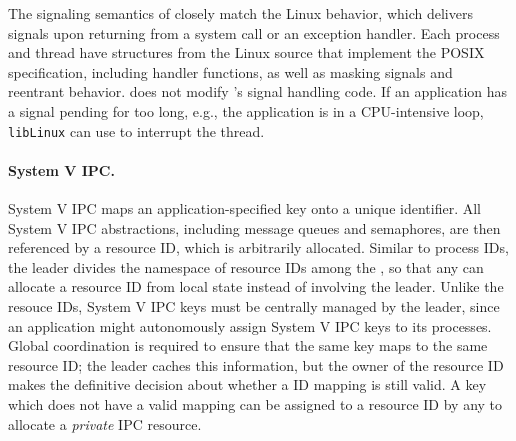 The signaling semantics of \thelibos{} closely match the Linux behavior, which
delivers signals upon returning from a system call
or an exception handler.
Each process and thread have  structures from the Linux source 
that implement the
POSIX specification, including handler functions, as well as masking signals and
reentrant behavior.
\thelibos{} does not modify \libc{}'s signal handling code. %
If an application has a signal pending for too long,
e.g., the application is in a CPU-intensive loop, {\tt libLinux} can use  to interrupt the thread. 




\begin{comment}
\graphene{} internally indexes point-to-point handles using PIDs.
In order to facilitate reallocation of PIDs without global coordination, 
\graphene{}-internal PIDs also include a {\em generation number},
allowing \picoprocs{} to lazily detect reuse similar to generation numbers 
for inodes in NFS~\cite{sandberg85nfs}.
\end{comment}

\paragraph{System V IPC.} System V IPC
maps an application-specified key onto a unique identifier.
All System V IPC abstractions, including message queues and semaphores,
are then referenced by a resource ID, which is arbitrarily allocated.
Similar to process IDs, 
the leader divides the namespace of resource IDs among the \picoprocs{},
so that any \picoproc{}
can allocate a resource ID from local state instead of involving the leader. %
Unlike the resouce IDs, System V IPC keys must be centrally managed
by the leader,
since an application might autonomously assign System V IPC keys to its processes.
Global coordination is required to ensure that the same key maps to the same resource ID;
the leader caches this information, but the owner of the resource ID 
makes the definitive decision about whether a ID mapping is still valid.
A key which does not have a valid mapping can be assigned to a resource ID by any \picoproc{} to allocate a {\em private} IPC resource.



